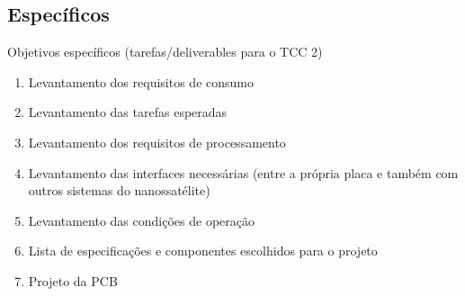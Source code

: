 \subsection{Específicos}\label{especificos}
Objetivos específicos (tarefas/deliverables para o TCC 2)
\begin{enumerate}
    \item Levantamento dos requisitos de consumo
    \item Levantamento das tarefas esperadas
    \item Levantamento dos requisitos de processamento
    \item Levantamento das interfaces necessárias (entre a própria placa e também com outros sistemas do nanossatélite)
    \item Levantamento das condições de operação
    \item Lista de especificações e componentes escolhidos para o projeto
    \item Projeto da PCB
\end{enumerate}
